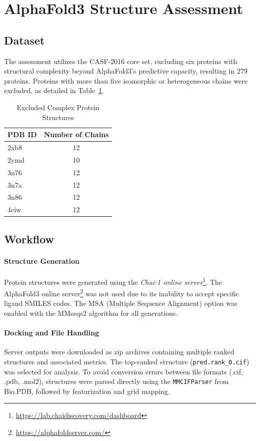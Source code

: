 \documentclass[unnumsec,webpdf,contemporary,large]{oup-authoring-template}
\theoremstyle{thmstyleone}%
\theoremstyle{thmstyletwo}%
\theoremstyle{thmstylethree}%
\begin{document}
\section{AlphaFold3 Structure Assessment}

\subsection{Dataset}
The assessment utilizes the CASF-2016 core set, excluding six proteins with structural complexity beyond AlphaFold3's predictive capacity, resulting in 279 proteins. Proteins with more than five isomorphic or heterogeneous chains were excluded, as detailed in Table~\ref{tab:complex}.

\begin{table}[H]
\centering
\caption{Excluded Complex Protein Structures}
\label{tab:complex}
\begin{tabular}{lc}
\toprule
PDB ID & Number of Chains \\
\midrule
2xb8 & 12 \\
2ymd & 10 \\
3n76 & 12 \\
3n7a & 12 \\
3n86 & 12 \\
4ciw & 12 \\
\bottomrule
\end{tabular}
\end{table}

\subsection{Workflow}
\vspace{0.5em}
\paragraph{Structure Generation}
Protein structures were generated using the \textit{Chai-1 online server}\footnote{\url{https://lab.chaidiscovery.com/dashboard}}. The AlphaFold3 online server\footnote{\url{https://alphafoldserver.com/}} was not used due to its inability to accept specific ligand SMILES codes. The MSA (Multiple Sequence Alignment) option was enabled with the MMseqs2 algorithm for all generations.

\paragraph{Docking and File Handling}
Server outputs were downloaded as zip archives containing multiple ranked structures and associated metrics. The top-ranked structure (\texttt{pred.rank\_0.cif}) was selected for analysis. To avoid conversion errors between file formats (.cif, .pdb, .mol2), structures were parsed directly using the \texttt{MMCIFParser} from Bio.PDB, followed by featurization and grid mapping.
\end{document}
